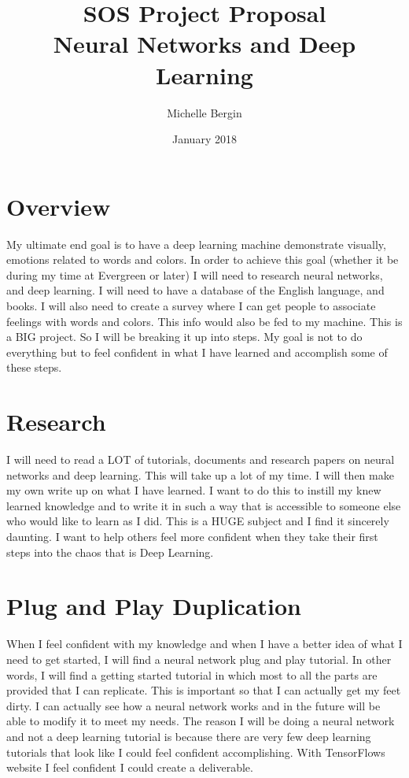 \documentclass{article}
\title{SOS Project Proposal\\
    \large{Neural Networks and Deep Learning}}
\author{Michelle Bergin}
\date{January 2018}
\begin{document}
\maketitle
\section{Overview}
My ultimate end goal is to have a deep learning machine demonstrate visually, emotions related to words and colors. In order to achieve this goal (whether it be during my time at Evergreen or later) I will need to research neural networks, and deep learning. I will need to have a database of the English language, and books. I will also need to create a survey where I can get people to associate feelings with words and colors. This info would also be fed to my machine. This is a BIG project. So I will be breaking it up into steps. My goal is not to do everything but to feel confident in what I have learned and accomplish some of these steps.

\section{Research}
I will need to read a LOT of tutorials, documents and research papers on neural networks and deep learning. This will take up a lot of my time. I will then make my own write up on what I have learned. I want to do this to instill my knew learned knowledge and to write it in such a way that is accessible to someone else who would like to learn as I did. This is a HUGE subject and I find it sincerely daunting. I want to help others feel more confident when they take their first steps into the chaos that is Deep Learning.

\section{Plug and Play Duplication}
When I feel confident with my knowledge and when I have a better idea of what I need to get started, I will find a neural network plug and play tutorial. In other words, I will find a getting started tutorial in which most to all the parts are provided that I can replicate. This is important so that I can actually get my feet dirty. I can actually see how a neural network works and in the future will be able to modify it to meet my needs. The reason I will be doing a neural network and not a deep learning tutorial is because there are very few deep learning tutorials that look like I could feel confident accomplishing. With TensorFlows website I feel confident I could create a deliverable.
\end{document}
